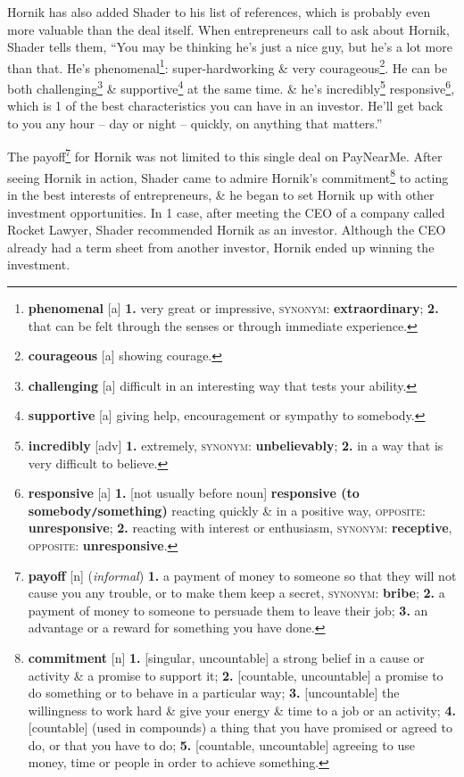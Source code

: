 \documentclass[oneside]{book}
\numberwithin{equation}{section}
\begin{document}
Hornik has also added Shader to his list of references, which is probably even more valuable than the deal itself. When entrepreneurs call to ask about Hornik, Shader tells them, ``You may be thinking he's just a nice guy, but he's a lot more than that. He's phenomenal\footnote{\textbf{phenomenal} [a] \textbf{1.} very great or impressive, \textsc{synonym}: \textbf{extraordinary}; \textbf{2.} that can be felt through the senses or through immediate experience.}: super-hardworking \& very courageous\footnote{\textbf{courageous} [a] showing courage.}. He can be both challenging\footnote{\textbf{challenging} [a] difficult in an interesting way that tests your ability.} \& supportive\footnote{\textbf{supportive} [a] giving help, encouragement or sympathy to somebody.} at the same time. \& he's incredibly\footnote{\textbf{incredibly} [adv] \textbf{1.} extremely, \textsc{synonym}: \textbf{unbelievably}; \textbf{2.} in a way that is very difficult to believe.} responsive\footnote{\textbf{responsive} [a] \textbf{1.} [not usually before noun] \textbf{responsive (to somebody\texttt{/}something)} reacting quickly \& in a positive way, \textsc{opposite}: \textbf{unresponsive}; \textbf{2.} reacting with interest or enthusiasm, \textsc{synonym}: \textbf{receptive}, \textsc{opposite}: \textbf{unresponsive}.}, which is 1 of the best characteristics you can have in an investor. He'll get back to you any hour -- day or night -- quickly, on anything that matters.''

The payoff\footnote{\textbf{payoff} [n] (\textit{informal}) \textbf{1.} a payment of money to someone so that they will not cause you any trouble, or to make them keep a secret, \textsc{synonym}: \textbf{bribe}; \textbf{2.} a payment of money to someone to persuade them to leave their job; \textbf{3.} an advantage or a reward for something you have done.} for Hornik was not limited to this single deal on PayNearMe. After seeing Hornik in action, Shader came to admire Hornik's commitment\footnote{\textbf{commitment} [n] \textbf{1.} [singular, uncountable] a strong belief in a cause or activity \& a promise to support it; \textbf{2.} [countable, uncountable] a promise to do something or to behave in a particular way; \textbf{3.} [uncountable] the willingness to work hard \& give your energy \& time to a job or an activity; \textbf{4.} [countable] (used in compounds) a thing that you have promised or agreed to do, or that you have to do; \textbf{5.} [countable, uncountable] agreeing to use money, time or people in order to achieve something.} to acting in the best interests of entrepreneurs, \& he began to set Hornik up with other investment opportunities. In 1 case, after meeting the CEO of a company called Rocket Lawyer, Shader recommended Hornik as an investor. Although the CEO already had a term sheet from another investor, Hornik ended up winning the investment.
\end{document}
